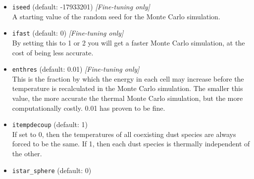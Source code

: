 \documentclass{report}
\begin{document}
\begin{itemize}
\item {\small\tt iseed} (default: -17933201) {\em [Fine-tuning only]}\\
  A starting value of the random seed for the Monte Carlo simulation. 
\item {\small\tt ifast} (default: 0) {\em [Fine-tuning only]}\\
  By setting this to 1 or 2 you will get a faster Monte Carlo simulation, 
  at the cost of being less accurate.
\item {\small\tt enthres} (default: 0.01) {\em [Fine-tuning only]}\\
  This is the fraction by which the energy in each cell may increase
  before the temperature is recalculated in the Monte Carlo simulation.
  The smaller this value, the more accurate the thermal Monte Carlo
  simulation, but the more computationally costly. 0.01 has proven to be
  fine.
\item {\small\tt itempdecoup} (default: 1)\\
  If set to 0, then the temperatures of all coexisting dust species are
  always forced to be the same. If 1, then each dust species is thermally
  independent of the other.
\item {\small\tt istar\_sphere} (default: 0)\\

\end{itemize}
\end{document}
